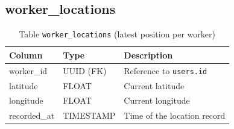 \subsection{worker\_locations}
\begin{table}[H]
  \centering
  \begin{tabularx}{\textwidth}{llX}
    \toprule
    \textbf{Column} & \textbf{Type} & \textbf{Description} \\
    \midrule
    worker\_id   & UUID (FK)  & Reference to \texttt{users.id} \\
    latitude     & FLOAT      & Current latitude \\
    longitude    & FLOAT      & Current longitude \\
    recorded\_at & TIMESTAMP  & Time of the location record \\
    \bottomrule
  \end{tabularx}
  \caption{Table \texttt{worker\_locations} (latest position per worker)}
\end{table}